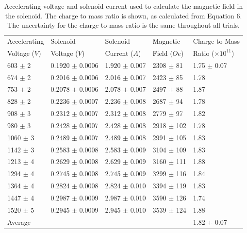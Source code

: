 \documentclass[%
 aip,
 amsmath,amssymb,
 reprint,%
floatfix,
]{revtex4-1}
\begin{document}
\begin{table}
	\centering
	\caption{Accelerating voltage and solenoid current used to calculate the magnetic field in the solenoid. The charge to mass ratio is shown, as calculated from Equation 6. The uncertainty for the charge to mass ratio is the same throughout all trials.}
	\begin{ruledtabular}
	\begin{tabular}{lllll}
		Accelerating&Solenoid&Solenoid&Magnetic&Charge to Mass\\
		Voltage ($V$)&Voltage ($V$)&Current ($A$)&Field ($Oe$)&Ratio ($\times 10^{11}$)\\
	\hline
	    603   $\pm$ 2     & 0.1920 $\pm$ 0.0006 & 1.920 $\pm$ 0.007 & 2308  $\pm$ 81 & 1.75 $\pm$ 0.07\\
	    674   $\pm$ 2     & 0.2016 $\pm$ 0.0006 & 2.016 $\pm$ 0.007 & 2423  $\pm$ 85 & 1.78\\
	    753   $\pm$ 2     & 0.2078 $\pm$ 0.0006 & 2.078 $\pm$ 0.007 & 2497  $\pm$ 88 & 1.87\\
	    828   $\pm$ 2     & 0.2236 $\pm$ 0.0007 & 2.236 $\pm$ 0.008 & 2687  $\pm$ 94 & 1.78\\
	    908   $\pm$ 3     & 0.2312 $\pm$ 0.0007 & 2.312 $\pm$ 0.008 & 2779  $\pm$ 97 & 1.82\\
	    980   $\pm$ 3     & 0.2428 $\pm$ 0.0007 & 2.428 $\pm$ 0.008 & 2918  $\pm$ 102 & 1.78\\
	    1060  $\pm$ 3     & 0.2489 $\pm$ 0.0007 & 2.489 $\pm$ 0.008 & 2991  $\pm$ 105 & 1.83\\
	    1142  $\pm$ 3     & 0.2583 $\pm$ 0.0008 & 2.583 $\pm$ 0.009 & 3104  $\pm$ 109 & 1.83\\
	    1213  $\pm$ 4     & 0.2629 $\pm$ 0.0008 & 2.629 $\pm$ 0.009 & 3160  $\pm$ 111 & 1.88\\
	    1294  $\pm$ 4     & 0.2745 $\pm$ 0.0008 & 2.745 $\pm$ 0.009 & 3299  $\pm$ 116 & 1.84\\
	    1364  $\pm$ 4     & 0.2824 $\pm$ 0.0008 & 2.824 $\pm$ 0.010 & 3394  $\pm$ 119 & 1.83\\
	    1447  $\pm$ 4     & 0.2987 $\pm$ 0.0009 & 2.987 $\pm$ 0.010 & 3590  $\pm$ 126 & 1.74\\
	    1520  $\pm$ 5     & 0.2945 $\pm$ 0.0009 & 2.945 $\pm$ 0.010 & 3539  $\pm$ 124 & 1.88\\
	    \hline
	    Average &	&	&	& 1.82 $\pm$ 0.07\\
	\end{tabular}%
	\end{ruledtabular}
\end{table}%
\end{document}

